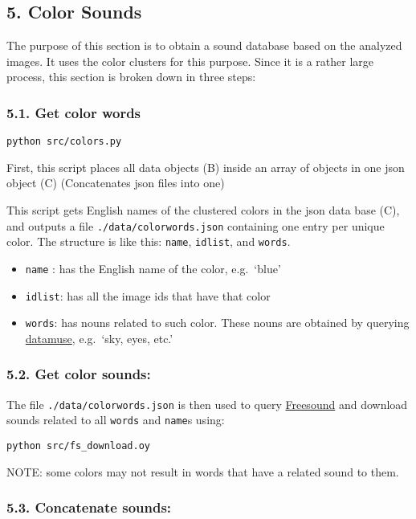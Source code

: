 \subsection*{5. Color Sounds}

The purpose of this section is to obtain a sound database based on the analyzed images. It uses the color clusters for this purpose. Since it is a rather large process, this section is broken down in three steps:


\subsubsection*{5.1. Get color words}

\texttt{python\ src/colors.py}

First, this script places all data objects (B) inside an array of objects in one \gls{json} object (C) (Concatenates \gls{json} files into one)

This script gets English names of the clustered colors in the \gls{json} data base (C), and outputs a file \texttt{./data/colorwords.json} containing one entry per unique color. The structure is like this: \texttt{name}, \texttt{idlist}, and \texttt{words}.

\begin{itemize}
  \singlespacing
  \singlespacing
  \singlespacing
\tightlist
\item
  \texttt{name} : has the English name of the color, e.g.~`blue'
\item
  \texttt{idlist}: has all the image ids that have that color
\item
  \texttt{words}: has nouns related to such color. These nouns are obtained by querying \href{https://datamuse.com}{datamuse}, e.g.~`sky, eyes, etc.'
\end{itemize}


\subsubsection*{5.2. Get color sounds:}

The file \texttt{./data/colorwords.json} is then used to query \href{https://freesound.org}{Freesound} and download sounds related to all \texttt{words} and \texttt{name}s using:

\texttt{python\ src/fs\_download.oy}

NOTE: some colors may not result in words that have a related sound to them.


\subsubsection*{5.3. Concatenate sounds:}

